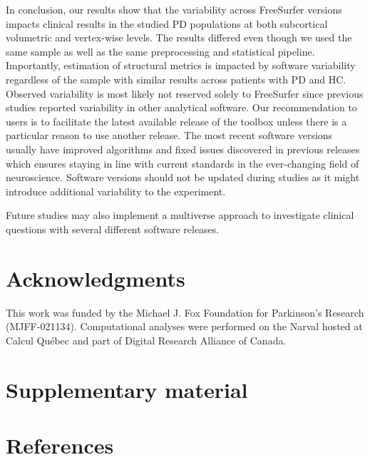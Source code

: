 \documentclass[11pt]{article}
\begin{document}
In conclusion, our results show that the variability across FreeSurfer versions impacts clinical results in the
studied PD populations at both subcortical volumetric and vertex-wise levels. The results differed even though we
used the same sample as well as the same preprocessing and statistical pipeline. Importantly, estimation of
structural metrics is impacted by software variability regardless of the sample with similar results across
patients with PD and HC. Observed variability is most likely not reserved solely to FreeSurfer since previous
studies reported variability in other analytical software. Our recommendation to users is to facilitate the latest
available release of the toolbox unless there is a particular reason to use another release. The most recent
software versions usually have improved algorithms and fixed issues discovered in previous releases which ensures
staying in line with current standards in the ever-changing field of neuroscience.  Software versions should not be
updated during studies as it might introduce additional variability to the experiment.

 Future studies may
also implement a multiverse approach to investigate clinical questions with several different software releases.

\section*{Acknowledgments}
This work was funded by the Michael J. Fox Foundation for Parkinson's Research (MJFF-021134). Computational analyses
were performed on the Narval  hosted at Calcul Québec and part of Digital Research
Alliance of Canada.

\section*{Supplementary material}

\section*{References}
\begingroup\small\setlength{\parindent}{0pt}\setlength{\parskip}{0.5ex}

\endgroup
\end{document}
